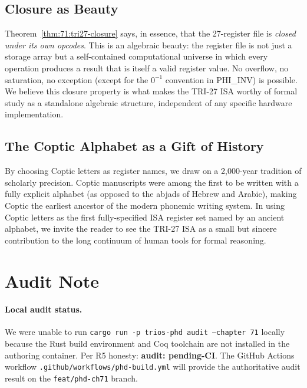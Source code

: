 \subsection{Closure as Beauty}
\label{subsec:71:closure-beauty}

Theorem~\ref{thm:71:tri27-closure} says, in essence, that the 27-register
file is \emph{closed under its own opcodes}.  This is an algebraic
beauty: the register file is not just a storage array but a
self-contained computational universe in which every operation
produces a result that is itself a valid register value.  No
overflow, no saturation, no exception (except for the
$0^{-1}$ convention in PHI\_INV) is possible.
We believe this closure property is what makes the TRI-27 ISA
worthy of formal study as a standalone algebraic structure, independent
of any specific hardware implementation.

\subsection{The Coptic Alphabet as a Gift of History}
\label{subsec:71:coptic-gift}

By choosing Coptic letters as register names, we draw on a 2,000-year
tradition of scholarly precision.  Coptic manuscripts were among the
first to be written with a fully explicit alphabet (as opposed to the
abjads of Hebrew and Arabic), making Coptic the earliest ancestor of
the modern phonemic writing system.  In using Coptic letters as
the first fully-specified ISA register set named by an ancient
alphabet, we invite the reader to see the TRI-27 ISA as a small
but sincere contribution to the long continuum of human tools for
formal reasoning.

\section{Audit Note}
\label{sec:71:audit}

\paragraph{Local audit status.}
We were unable to run \texttt{cargo run -p trios-phd audit --chapter 71}
locally because the Rust build environment and Coq toolchain are not
installed in the authoring container.  Per R5 honesty:
\textbf{audit: pending-CI}.  The GitHub Actions workflow
\texttt{.github/workflows/phd-build.yml} will provide the authoritative
audit result on the \texttt{feat/phd-ch71} branch.

